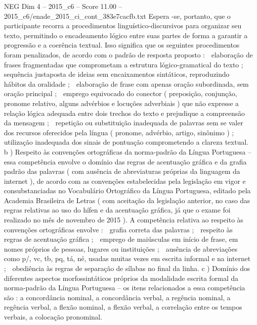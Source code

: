 \begin{textsample}{NEG Dim 4 – 2015\_c6 – Score 11.00 – 2015\_c6/enade\_2015\_ci\_cont\_383e7cacfb.txt}
Espera -se, portanto, que o participante recorra a procedimentos linguístico-discursivos para organizar seu texto, permitindo o encadeamento lógico entre suas partes de forma a garantir a progressão e a coerência textual.
Isso significa que os seguintes procedimentos foram penalizados, de acordo com o padrão de resposta proposto :  elaboração de frases fragmentadas que comprometam a estrutura lógico-gramatical do texto ;  sequência justaposta de ideias sem encaixamentos sintáticos, reproduzindo hábitos da oralidade ;  elaboração de frase com apenas oração subordinada, sem oração principal ;  emprego equivocado do conector ( preposição, conjunção, pronome relativo, alguns advérbios e locuções adverbiais ) que não expresse a relação lógica adequada entre dois trechos do texto e prejudique a compreensão da mensagem ;  repetição ou substituição inadequada de palavras sem se valer dos recursos oferecidos pela língua ( pronome, advérbio, artigo, sinônimo ) ;  utilização inadequada dos sinais de pontuação comprometendo a clareza textual. b ) Respeito às convenções ortográficas da norma-padrão da Língua Portuguesa – essa competência envolve o domínio das regras de acentuação gráfica e da grafia padrão das palavras ( com ausência de abreviaturas próprias da linguagem da internet ), de acordo com as convenções estabelecidas pela legislação em vigor e consubstanciadas no Vocabulário Ortográfico da Língua Portuguesa, editado pela Academia Brasileira de Letras ( com aceitação da legislação anterior, no caso das regras relativas ao uso do hífen e da acentuação gráfica, já que o exame foi realizado no mês de novembro de 2015 ).
A competência relativa ao respeito às convenções ortográficas envolve :  grafia correta das palavras ;  respeito às regras de acentuação gráfica ;  emprego de maiúsculas em início de frase, em nomes próprios de pessoas, lugares ou instituições ;  ausência de abreviações como p/, vc, tb, pq, tá, né, usadas muitas vezes em escrita informal e na internet ;  obediência às regras de separação de sílabas no final da linha. c ) Domínio dos diferentes aspectos morfossintáticos próprios da modalidade escrita formal da norma-padrão da Língua Portuguesa – os itens relacionados a essa competência são : a concordância nominal, a concordância verbal, a regência nominal, a regência verbal, a flexão nominal, a flexão verbal, a correlação entre os tempos verbais, a colocação pronominal.

\end{textsample}
